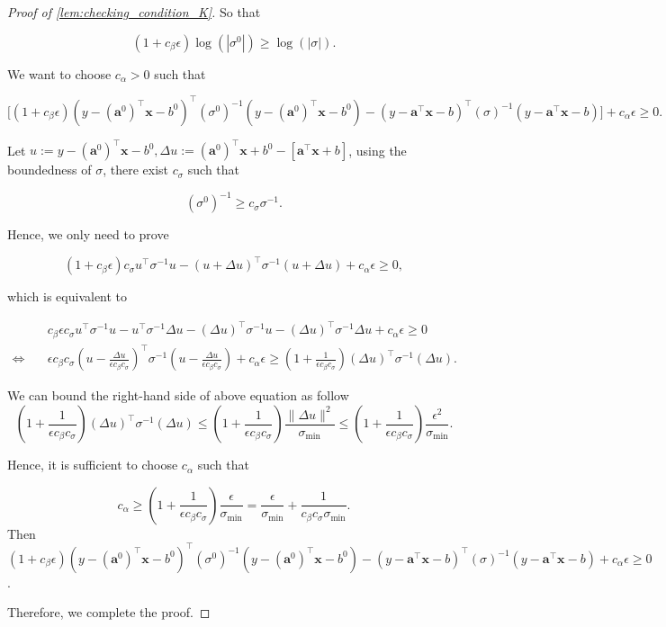 \documentclass[twoside]{article}
\theoremstyle{plain}
\theoremstyle{definition}
\theoremstyle{plain}
\def\va{{\bm{a}}}
\def\vx{{\bm{x}}}
\begin{document}
\begin{proof}[Proof of \cref{lem:checking_condition_K}]
So that

$$
\left(1+c_{\beta} \epsilon\right) \log \left(|\sigma^{0}|\right) \geq \log (|\sigma|).
$$

We want to choose $c_{\alpha}>0$ such that

$$
\Big[\left(1+c_{\beta} \epsilon\right)\left(y-(\va^{0})^{\top} \vx-b^{0}\right)^{\top}\left(\sigma^{0}\right)^{-1}\left(y-(\va^{0})^{\top} \vx-b^{0}\right)-(y-\va^{\top} \vx-b)^{\top}(\sigma)^{-1}(y-\va^{\top} \vx-b)\Big]+c_{\alpha} \epsilon \geq 0.
$$

Let $u:=y-(\va^{0})^{\top} \vx-b^{0}, \Delta u:= (\va^{0})^{\top} \vx+b^{0} - [\va^{\top} \vx+b]$, using the boundedness of $\sigma$, there exist $c_{\sigma}$ such that

$$(\sigma^{0})^{-1} \geq c_{\sigma} \sigma^{-1}.$$

Hence, we only need to prove

$$
\left(1+c_{\beta} \epsilon\right) c_{\sigma} u^{\top} \sigma^{-1} u-(u+\Delta u)^{\top} \sigma^{-1}(u+\Delta u)+c_{\alpha} \epsilon \geq 0,
$$

which is equivalent to

\begin{align*}
&c_{\beta} \epsilon c_{\sigma} u^{\top} \sigma^{-1} u-u^{\top} \sigma^{-1} \Delta u-(\Delta u)^{\top} \sigma^{-1} u-(\Delta u)^{\top} \sigma^{-1} \Delta u+c_{\alpha} \epsilon \geq 0 \\
\Leftrightarrow \quad&\epsilon c_{\beta} c_{\sigma}\left(u-\frac{\Delta u}{\epsilon c_{\beta} c_{\sigma}}\right)^{\top} \sigma^{-1}\left(u-\frac{\Delta u}{\epsilon c_{\beta} c_{\sigma}}\right)+c_{\alpha} \epsilon \geq\left(1+\frac{1}{\epsilon c_{\beta} c_{\sigma}}\right)(\Delta u)^{\top} \sigma^{-1}(\Delta u) .
\end{align*}


We can bound the right-hand side of above equation as follow
$$
\left(1+\frac{1}{\epsilon c_{\beta} c_{\sigma}}\right)(\Delta u)^{\top} \sigma^{-1}(\Delta u) \leq\left(1+\frac{1}{\epsilon c_{\beta} c_{\sigma}}\right) \frac{\|\Delta u\|^{2}}{\sigma_{\min }} \leq\left(1+\frac{1}{\epsilon c_{\beta} c_{\sigma}}\right) \frac{\epsilon^{2}}{\sigma_{\min }} .
$$

Hence, it is sufficient to choose $c_{\alpha}$ such that

$$
c_{\alpha} \geq\left(1+\frac{1}{\epsilon c_{\beta} c_{\sigma}}\right) \frac{\epsilon}{\sigma_{\min }}=\frac{\epsilon}{\sigma_{\min }}+\frac{1}{c_{\beta} c_{\sigma} \sigma_{\min }}.
$$
Then
$\left(1+c_{\beta} \epsilon\right)\left(y-(\va^{0})^{\top} \vx-b^{0}\right)^{\top}\left(\sigma^{0}\right)^{-1}\left(y-(\va^{0})^{\top} \vx-b^{0}\right)-(y-\va^{\top} \vx-b)^{\top}(\sigma)^{-1}(y-\va^{\top} \vx-b)+c_{\alpha} \epsilon \geq 0$.

Therefore, we complete the proof.
\end{proof}
\end{document}
